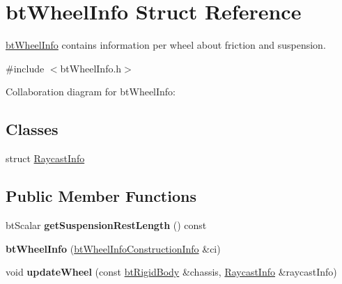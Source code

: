 \hypertarget{structbt_wheel_info}{\section{bt\+Wheel\+Info Struct Reference}
\label{structbt_wheel_info}
}


\hyperlink{structbt_wheel_info}{bt\+Wheel\+Info} contains information per wheel about friction and suspension.  




{\ttfamily \#include $<$bt\+Wheel\+Info.\+h$>$}



Collaboration diagram for bt\+Wheel\+Info\+:
\subsection*{Classes}
\begin{DoxyCompactItemize}
\item 
struct \hyperlink{structbt_wheel_info_1_1_raycast_info}{Raycast\+Info}
\end{DoxyCompactItemize}
\subsection*{Public Member Functions}
\begin{DoxyCompactItemize}
\item 
\hypertarget{structbt_wheel_info_af68ffc2a212541c6b43efc76cd0b60b4}{bt\+Scalar {\bfseries get\+Suspension\+Rest\+Length} () const }\label{structbt_wheel_info_af68ffc2a212541c6b43efc76cd0b60b4}

\item 
\hypertarget{structbt_wheel_info_ac3fdf40cfa2b5a8c8d7d11c545486c31}{{\bfseries bt\+Wheel\+Info} (\hyperlink{structbt_wheel_info_construction_info}{bt\+Wheel\+Info\+Construction\+Info} \&ci)}\label{structbt_wheel_info_ac3fdf40cfa2b5a8c8d7d11c545486c31}

\item 
\hypertarget{structbt_wheel_info_a3eee5f0febe5dae578bc91994d064e7b}{void {\bfseries update\+Wheel} (const \hyperlink{classbt_rigid_body}{bt\+Rigid\+Body} \&chassis, \hyperlink{structbt_wheel_info_1_1_raycast_info}{Raycast\+Info} \&raycast\+Info)}\label{structbt_wheel_info_a3eee5f0febe5dae578bc91994d064e7b}

\end{DoxyCompactItemize}
